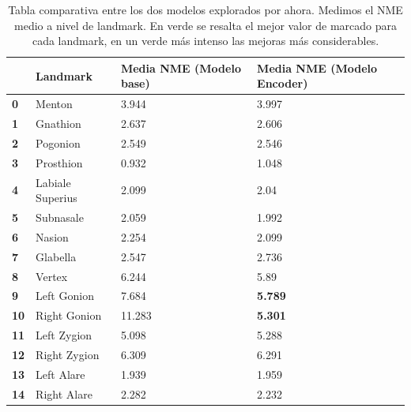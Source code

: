             \begin{table}[!ht]
                \centering
                \caption{Tabla comparativa entre los dos modelos explorados por ahora. Medimos el NME medio a nivel de landmark. En verde se resalta el mejor valor de marcado para cada landmark, en un verde más intenso las mejoras más considerables.}
                \begin{tabular}{|l|l|l|l|}
                \hline
                    \textbf{} & \textbf{Landmark} & \textbf{Media NME (Modelo base)} & \textbf{Media NME (Modelo Encoder)} \\ \hline
                    \textbf{0} & Menton & \cellcolor{green!25} 3.944 & 3.997 \\ \hline
                    \textbf{1} & Gnathion & 2.637 & \cellcolor{green!25} 2.606 \\ \hline
                    \textbf{2} & Pogonion & 2.549 & \cellcolor{green!25} 2.546 \\ \hline
                    \textbf{3} & Prosthion & \cellcolor{green!25} 0.932 & 1.048 \\ \hline
                    \textbf{4} & Labiale Superius & 2.099 & \cellcolor{green!25} 2.04 \\ \hline
                    \textbf{5} & Subnasale & 2.059 & \cellcolor{green!25} 1.992 \\ \hline
                    \textbf{6} & Nasion & 2.254 & \cellcolor{green!25} 2.099 \\ \hline
                    \textbf{7} & Glabella & \cellcolor{green!25} 2.547 & 2.736 \\ \hline
                    \textbf{8} & Vertex & 6.244 &\cellcolor{green!25} 5.89 \\ \hline
                    \textbf{9} & Left Gonion & 7.684 & \cellcolor{green!50} \textbf{5.789} \\ \hline
                    \textbf{10} & Right Gonion & 11.283 & \cellcolor{green!50} \textbf{5.301} \\ \hline
                    \textbf{11} & Left Zygion & \cellcolor{green!25} 5.098 & 5.288 \\ \hline
                    \textbf{12} & Right Zygion & 6.309 & \cellcolor{green!25} 6.291 \\ \hline
                    \textbf{13} & Left Alare & \cellcolor{green!25} 1.939 & 1.959 \\ \hline
                    \textbf{14} & Right Alare & 2.282 & \cellcolor{green!25} 2.232 \\ \hline

\end{tabular}
\end{table}
